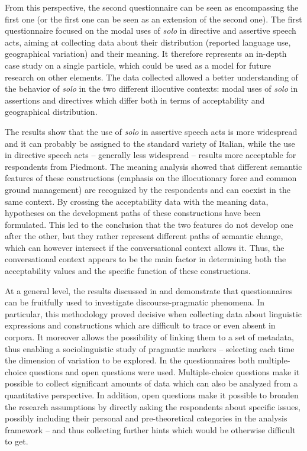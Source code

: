 From this perspective, the second questionnaire can be seen as encompassing the first one (or the first one can be seen as an extension of the second one). The first questionnaire focused on the modal uses of \textit{solo} in directive and assertive speech acts, aiming at collecting data about their distribution (reported language use, geographical variation) and their meaning. It therefore represents an in-depth case study on a single particle, which could be used as a model for future research on other elements. The data collected allowed a better understanding of the behavior of \textit{solo} in the two different illocutive contexts: modal uses of \textit{solo} in assertions and directives which differ both in terms of acceptability and geographical distribution.

\hspace*{-1.5pt}The results show that the use of \textit{solo} in assertive speech acts is more widespread and it can probably be assigned to the standard variety of Italian, while the use in directive speech acts – generally less widespread – results more acceptable for respondents from Piedmont. The meaning analysis showed that different semantic features of these constructions (emphasis on the illocutionary force and common ground management) are recognized by the respondents and can coexist in the same context. By crossing the acceptability data with the meaning data, hypotheses on the development paths of these constructions have been formulated. This led to the conclusion that the two features do not develop one after the other, but they rather represent different paths of semantic change, which can however intersect if the conversational context allows it. Thus, the conversational context appears to be the main factor in determining both the acceptability values and the specific function of these constructions.

At a general level, the results discussed in  and  demonstrate that questionnaires can be fruitfully used to investigate discourse-prag\-mat\-ic phenomena. In particular, this methodology proved decisive when collecting data about linguistic expressions and constructions which are difficult to trace or even absent in corpora. It moreover allows the possibility of linking them to a set of metadata, thus enabling a sociolinguistic study of pragmatic markers – selecting each time the dimension of variation to be explored. In the questionnaires both multiple-choice questions and open questions were used. Multiple-choice questions make it possible to collect significant amounts of data which can also be analyzed from a quantitative perspective. In addition, open questions make it possible to broaden the research assumptions by directly asking the respondents about specific issues, possibly including their personal and pre-theoretical categories in the analysis framework – and thus collecting further hints which would be otherwise difficult to get.

